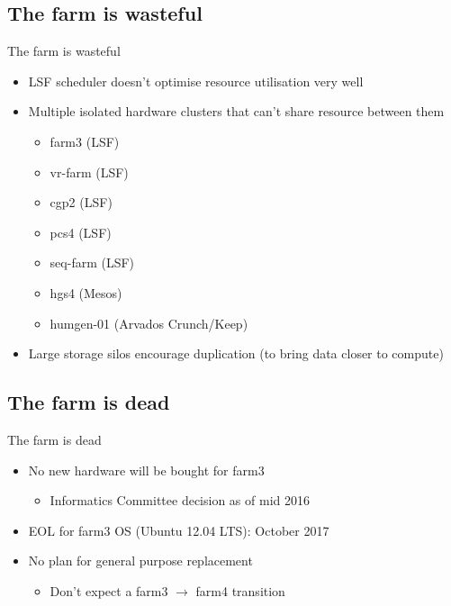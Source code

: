 \documentclass[xcolor=x11names,compress]{beamer}
\renewcommand{\(}{\begin{columns}}
\renewcommand{\)}{\end{columns}}
\newcommand{\<}[1]{\begin{column}{#1}}
\renewcommand{\>}{\end{column}}
\begin{document}
\subsection*{The farm is wasteful}
\begin{frame}{The farm is wasteful}
\dcbackground
\begin{shadedbox}
\begin{itemize}
\item LSF scheduler doesn't optimise resource utilisation very well
\item Multiple isolated hardware clusters that can't share resource between them
	\begin{itemize}
	\item farm3 (LSF)
	\item vr-farm (LSF)
	\item cgp2 (LSF)
	\item pcs4 (LSF)
	\item seq-farm (LSF)
	\item hgs4 (Mesos)
	\item humgen-01 (Arvados Crunch/Keep)
	\end{itemize}
\item Large storage silos encourage duplication (to bring data closer to compute)
\end{itemize}
\end{shadedbox}
\end{frame}

\subsection*{The farm is dead}
\begin{frame}{The farm is dead}
\dcbackground
\begin{shadedbox}
\begin{itemize}
\item No new hardware will be bought for farm3
	\begin{itemize}
	\item Informatics Committee decision as of mid 2016
	\end{itemize}
\item EOL for farm3 OS (Ubuntu 12.04 LTS): October 2017
\item No plan for general purpose replacement %
	\begin{itemize}
	\item Don't expect a farm3 $\rightarrow$ farm4 transition %
	\end{itemize}
\end{itemize}
\end{shadedbox}
\end{frame}
\end{document}
